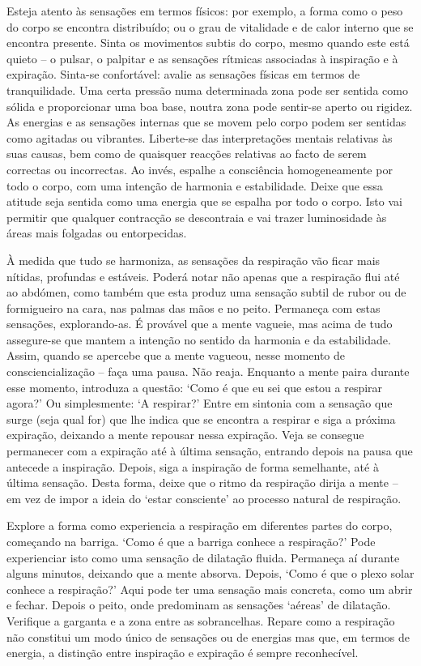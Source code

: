 Esteja atento às sensações em termos físicos: por exemplo, a forma como o peso do corpo se encontra distribuído; ou o grau de vitalidade e de calor interno que se encontra presente. Sinta os movimentos subtis do corpo, mesmo quando este está quieto -- o pulsar, o palpitar e as sensações rítmicas associadas à inspiração e à expiração. Sinta-se confortável: avalie as sensações físicas em termos de tranquilidade. Uma certa pressão numa determinada zona pode ser sentida como sólida e proporcionar uma boa base, noutra zona pode sentir-se aperto ou rigidez. As energias e as sensações internas que se movem pelo corpo podem ser sentidas como agitadas ou vibrantes. Liberte-se das interpretações mentais relativas às suas causas, bem como de quaisquer reacções relativas ao facto de serem correctas ou incorrectas. Ao invés, espalhe a consciência homogeneamente por todo o corpo, com uma intenção de harmonia e estabilidade. Deixe que essa atitude seja sentida como uma energia que se espalha por todo o corpo. Isto vai permitir que qualquer contracção se descontraia e vai trazer luminosidade às áreas mais folgadas ou entorpecidas.

À medida que tudo se harmoniza, as sensações da respiração vão ficar mais nítidas, profundas e estáveis. Poderá notar não apenas que a respiração flui até ao abdómen, como também que esta produz uma sensação subtil de rubor ou de formigueiro na cara, nas palmas das mãos e no peito. Permaneça com estas sensações, explorando-as. É provável que a mente vagueie, mas acima de tudo assegure-se que mantem a intenção no sentido da harmonia e da estabilidade. Assim, quando se apercebe que a mente vagueou, nesse momento de consciencialização -- faça uma pausa. Não reaja. Enquanto a mente paira durante esse momento, introduza a questão: `Como é que eu sei que estou a respirar agora?' Ou simplesmente: `A respirar?' Entre em sintonia com a sensação que surge (seja qual for) que lhe indica que se encontra a respirar e siga a próxima expiração, deixando a mente repousar nessa expiração. Veja se consegue permanecer com a expiração até à última sensação, entrando depois na pausa que antecede a inspiração. Depois, siga a inspiração de forma semelhante, até à última sensação. Desta forma, deixe que o ritmo da respiração dirija a mente -- em vez de impor a ideia do `estar consciente' ao processo natural de respiração.

Explore a forma como experiencia a respiração em diferentes partes do corpo, começando na barriga. `Como é que a barriga conhece a respiração?' Pode experienciar isto como uma sensação de dilatação fluida. Permaneça aí durante alguns minutos, deixando que a mente absorva. Depois, `Como é que o plexo solar conhece a respiração?' Aqui pode ter uma sensação mais concreta, como um abrir e fechar. Depois o peito, onde predominam as sensações `aéreas' de dilatação. Verifique a garganta e a zona entre as sobrancelhas. Repare como a respiração não constitui um modo único de sensações ou de energias mas que, em termos de energia, a distinção entre inspiração e expiração é sempre reconhecível.

